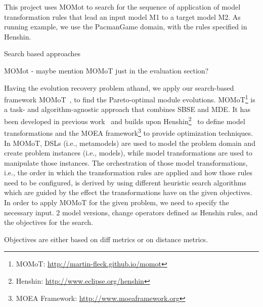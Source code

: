 This project uses MOMot to search for the sequence of application of model transformation rules that lead an input model M1 to a target model M2. As running example, we use the PacmanGame domain, with the rules specified in Henshin.


Search based approaches

MOMot - maybe mention MOMoT just in the evaluation section? 



Having the evolution recovery problem athand, we apply our search-based framework MOMoT~\cite{Fleck15,FleckTW16}, to find the Pareto-optimal module evolutions. MOMoT\footnote{MOMoT: \url{http://martin-fleck.github.io/momot}} is a task- and algorithm-agnostic approach that combines SBSE and MDE.
It has been developed in previous work~\cite{Fleck15} and builds upon Henshin\footnote{Henshin: \url{http://www.eclipse.org/henshin}}~\cite{Arendt10} to define model transformations and the MOEA framework\footnote{MOEA Framework: \url{http://www.moeaframework.org}} to provide optimization techniques. In MOMoT, DSLs (i.e., metamodels) are used to model the problem domain and create problem instances (i.e., models), while model transformations are used to manipulate those instances.
The orchestration of those model transformations, i.e., the order in which the transformation rules are applied and how those rules need to be configured, is derived by using different heuristic search algorithms which are guided by the effect the transformations have on the given objectives.
In order to apply MOMoT for the given problem, we need to specify the necessary input.
2 model versions, change operators defined as Henshin rules, and the objectives for the search.

Objectives are either based on diff metrics or on distance metrics. 
